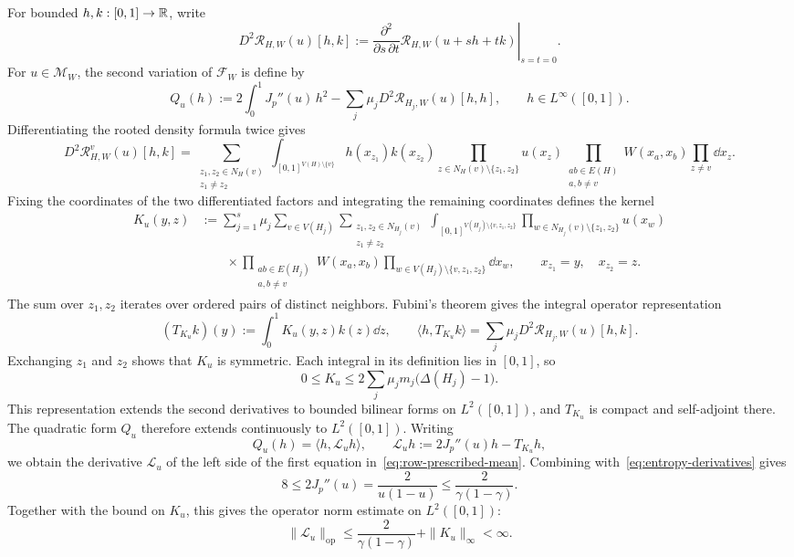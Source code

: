 For bounded $h,k:[0,1]\to\mathbb R$, write
\[
  D^2\mathcal R_{H,W}(u)[h,k]
  :=\left.\frac{\partial^2}{\partial s\,\partial t}
    \mathcal R_{H,W}(u+sh+tk)\right|_{s=t=0}.
\]
For $u\in\mathcal M_W$, the second variation of $\mathcal F_W$ is define by
\[
  Q_u(h):=2\int_0^1J_p''(u)\,h^2-\sum_j\mu_jD^2\mathcal R_{H_j,W}(u)[h,h],
  \qquad h\in L^\infty([0,1]).
\]
Differentiating the rooted density formula twice gives
\[
  D^2\mathcal R_{H,W}^v(u)[h,k]
  =\sum_{\substack{z_1,z_2\in N_H(v)\\z_1\ne z_2}}
  \int_{[0,1]^{V(H)\setminus\{v\}}}
  h(x_{z_1})k(x_{z_2})
  \prod_{z\in N_H(v)\setminus\{z_1,z_2\}}u(x_z)
  \prod_{\substack{ab\in E(H)\\a,b\ne v}}W(x_a,x_b)
  \prod_{z\ne v}\dd x_z.
\]
Fixing the coordinates of the two differentiated factors and integrating
the remaining coordinates defines the kernel
\begin{align*}
  K_u(y,z)
  &:=\sum_{j=1}^s\mu_j\sum_{v\in V(H_j)}
    \sum_{\substack{z_1,z_2\in N_{H_j}(v)\\z_1\ne z_2}}
    \int_{[0,1]^{V(H_j)\setminus\{v,z_1,z_2\}}}
    \prod_{w\in N_{H_j}(v)\setminus\{z_1,z_2\}}u(x_w)\\
  &\qquad{}\times
    \prod_{\substack{ab\in E(H_j)\\a,b\ne v}}W(x_a,x_b)
    \prod_{w\in V(H_j)\setminus\{v,z_1,z_2\}}\dd x_w,
    \qquad x_{z_1}=y,\quad x_{z_2}=z.
\end{align*}
The sum over $z_1,z_2$ iterates over ordered pairs of distinct neighbors.
Fubini's theorem gives the integral operator representation
\[
  (T_{K_u}k)(y):=\int_0^1K_u(y,z)k(z)\dd z,
  \qquad \langle h,T_{K_u}k\rangle=\sum_j\mu_jD^2\mathcal R_{H_j,W}(u)[h,k].
\]
Exchanging $z_1$ and $z_2$ shows that $K_u$ is symmetric.
Each integral in its definition lies in $[0,1]$, so
\[
  0\le K_u\le2\sum_j\mu_jm_j\bigl(\Delta(H_j)-1\bigr).
\]
This representation extends the second derivatives to bounded bilinear
forms on $L^2([0,1])$, and $T_{K_u}$ is compact and self-adjoint there.
The quadratic form $Q_u$ therefore extends continuously to $L^2([0,1])$.
Writing
\[
  Q_u(h)=\langle h,\mathcal L_uh\rangle,
  \qquad
  \mathcal L_uh:=2J_p''(u)h-T_{K_u}h,
\]
we obtain the derivative $\mathcal L_u$ of the left side of the first
equation in~\eqref{eq:row-prescribed-mean}.
Combining  with~\eqref{eq:entropy-derivatives} gives
\begin{equation}\label{eq:row-entropy-curvature}
  8\le2J_p''(u)=\frac{2}{u(1-u)}\le\frac{2}{\gamma(1-\gamma)}.
\end{equation}
Together with the bound on $K_u$, this gives the operator norm estimate
on $L^2([0,1])$:
\[
  \|\mathcal L_u\|_{\mathrm{op}}\le\frac{2}{\gamma(1-\gamma)}+\|K_u\|_\infty<\infty.
\]

